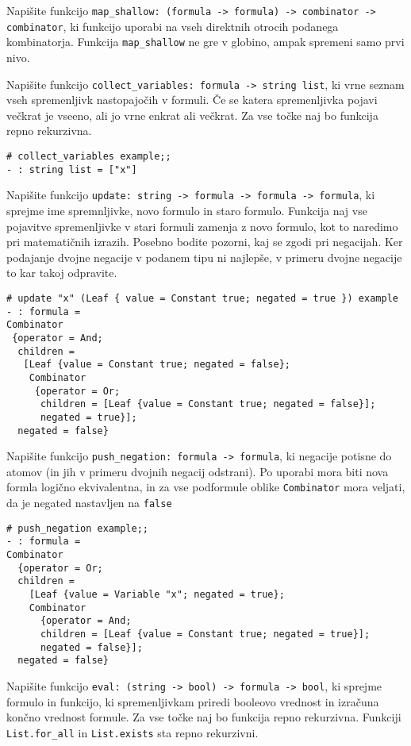 \documentclass[arhiv]{../izpit}
\begin{document}
\podnaloga
Napišite funkcijo \verb|map_shallow: (formula -> formula) -> combinator -> combinator|,
ki funkcijo uporabi na vseh direktnih otrocih podanega kombinatorja.
Funkcija \verb|map_shallow| ne gre v globino, ampak spremeni samo prvi nivo.

\podnaloga
Napišite funkcijo \verb|collect_variables: formula -> string list|, ki vrne seznam vseh spremenljivk nastopajočih v formuli.
Če se katera spremenljivka pojavi večkrat je vseeno, ali jo vrne enkrat ali večkrat.
Za vse točke naj bo funkcija repno rekurzivna.

\begin{verbatim}
# collect_variables example;;
- : string list = ["x"]
\end{verbatim}

\podnaloga
Napišite funkcijo \verb|update: string -> formula -> formula -> formula|, ki sprejme ime spremnljivke, novo formulo in staro formulo.
Funkcija naj vse pojavitve spremenljivke v stari formuli zamenja z novo formulo, kot to naredimo pri matematičnih izrazih.
Posebno bodite pozorni, kaj se zgodi pri negacijah. Ker podajanje dvojne negacije v podanem tipu ni najlepše,
v primeru dvojne negacije to kar takoj odpravite.

\begin{verbatim}
# update "x" (Leaf { value = Constant true; negated = true }) example
- : formula =
Combinator
 {operator = And;
  children =
   [Leaf {value = Constant true; negated = false};
    Combinator
     {operator = Or;
      children = [Leaf {value = Constant true; negated = false}];
      negated = true}];
  negated = false}
\end{verbatim}

\podnaloga
Napišite funkcijo \verb|push_negation: formula -> formula|, ki negacije potisne do atomov (in jih v primeru dvojnih negacij odstrani).
Po uporabi mora biti nova formla logično ekvivalentna, in za vse podformule oblike \verb|Combinator| mora veljati, da je negated nastavljen na \verb|false|

\begin{verbatim}
# push_negation example;;
- : formula =
Combinator
  {operator = Or;
  children =
    [Leaf {value = Variable "x"; negated = true};
    Combinator
      {operator = And;
      children = [Leaf {value = Constant true; negated = true}];
      negated = false}];
  negated = false}
\end{verbatim}

\podnaloga
Napišite funkcijo \verb|eval: (string -> bool) -> formula -> bool|, ki sprejme formulo in funkcijo, ki spremenljivkam priredi booleovo vrednost
in izračuna končno vrednost formule.
Za vse točke naj bo funkcija repno rekurzivna.
Funkciji \verb|List.for_all| in \verb|List.exists| sta repno rekurzivni.
\end{document}
